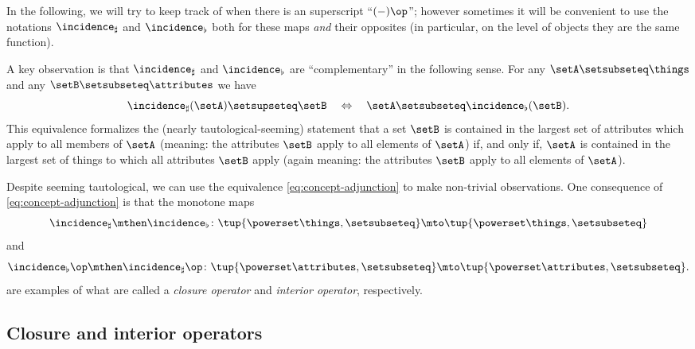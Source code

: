 In the following, we will try to keep track of when there is an superscript ``$( - )\op $''; however sometimes it will be convenient to use the notations $\incidence_\sharp$ and $\incidence_\flat$ both for these maps \emph{and} their opposites (in particular, on the level of objects they are the same function).

A key observation is that $\incidence_\sharp$ and $\incidence_\flat$ are ``complementary'' in the following sense.
For any $\setA \setsubseteq \things$ and any $\setB \setsubseteq \attributes$ we have
\begin{equation}\label{eq:concept-adjunction}
    \incidence_\sharp(\setA) \setsupseteq \setB \quad \Leftrightarrow \quad \setA \setsubseteq \incidence_\flat(\setB).
\end{equation}
This equivalence formalizes the (nearly tautological-seeming) statement that a set $\setB$ is contained in the largest set of attributes which apply to all members of $\setA$ (meaning: the attributes $\setB$ apply to all elements of $\setA$) if, and only if, $\setA$ is contained in the largest set of things to which all attributes $\setB$ apply (again meaning: the attributes $\setB$ apply to all elements of $\setA$).

Despite seeming tautological, we can use the equivalence \cref{eq:concept-adjunction} to make non-trivial observations.
One consequence of \cref{eq:concept-adjunction} is that the monotone maps
\begin{equation}\label{eq:fca-closure-operator-things}
    \incidence_\sharp \mthen \incidence_\flat \colon \tup{\powerset \things, \setsubseteq} \mto \tup{\powerset \things, \setsubseteq}
\end{equation}
and
\begin{equation}\label{eq:fca-closure-operator-attributes}
    \incidence_\flat\op \mthen \incidence_\sharp\op \colon \tup{\powerset \attributes, \setsubseteq} \mto \tup{\powerset \attributes, \setsubseteq}.
\end{equation}
are examples of what are called a \emph{closure operator} and \emph{interior operator}, respectively.

\subsection{Closure and interior operators}

